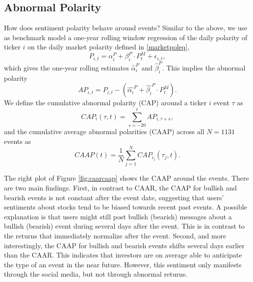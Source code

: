 
\subsection{Abnormal Polarity}
How does sentiment polarity behave around events? Similar to the above, we use as benchmark model a one-year rolling window regression of the daily polarity of ticker $i$ on the daily market polarity defined in \eqref{marketpoleq}, 
\begin{equation}
    P_{i,t}= \alpha_i^P  + \beta_i^P \cdot P_t^M  + \epsilon_{i,t},
\end{equation}
which gives the one-year rolling estimates $\hat{\alpha}_i^P$ and $\hat{\beta}_i^P$. This implies the abnormal polarity 
\begin{equation}
      AP_{i,t} = P_{i,t} - \left(\hat{\alpha_i}^P + \hat{\beta_i}^P \cdot P_t^M\right).
\end{equation}
We define the cumulative abnormal polarity (CAP) around a ticker $i$ event $\tau$ as 
\begin{equation}\label{eq_CAPtaut}
    CAP_i(\tau,t) = \sum_{s=- 20}^{t} AP_{i,\tau + s},
\end{equation}     
and the cumulative average abnormal polarities (CAAP) across all $N=1131$ events as 
\begin{equation}
       CAAP(t) = \dfrac{1}{N} \sum_{j=1}^N CAP_{i_j}(\tau_j,t).
\end{equation}

The right plot of Figure \ref{fig:caarcaap} shows the CAAP around the events. There are two main findings. First, in contrast to CAAR, the CAAP for bullish and bearish events is not constant after the event date, suggesting that users' sentiments about stocks tend to be biased towards recent past events. A possible explanation is that users might still post bullish (bearish) messages about a bullish (bearish) event during several days after the event. This is in contrast to the returns that immediately normalize after the event. Second, and more interestingly, the CAAP for bullish and bearish events shifts several days earlier than the CAAR. This indicates that investors are on average able to anticipate the type of an event in the near future. However, this sentiment only manifests through the social media, but not through abnormal returns. 

